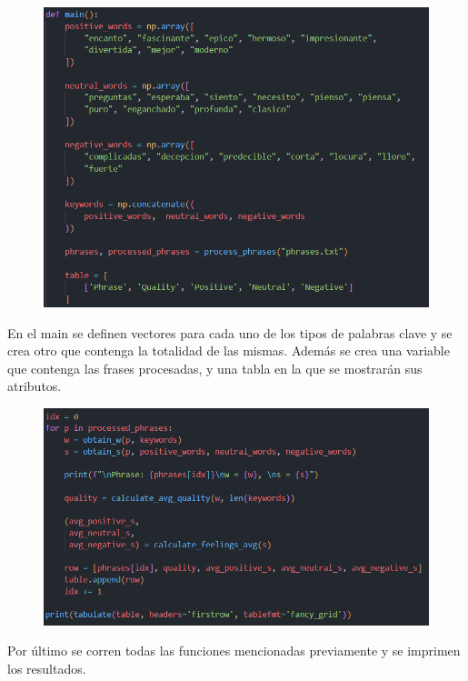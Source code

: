 \documentclass{article}
\begin{document}
    \begin{figure}[H]
        \centering
        \includegraphics[width=1\linewidth]{assets/Codigo4}
    \end{figure}
    En el main se definen vectores para cada uno de los tipos de palabras clave y se crea otro que contenga la totalidad de las mismas. Además se crea una variable que contenga las frases procesadas, y una tabla en la que se mostrarán sus atributos.\\

    \begin{figure}[H]
        \centering
        \includegraphics[width=1\linewidth]{assets/Codigo5}
    \end{figure}
    Por último se corren todas las funciones mencionadas previamente y se imprimen los resultados.\\
    
\end{document}

